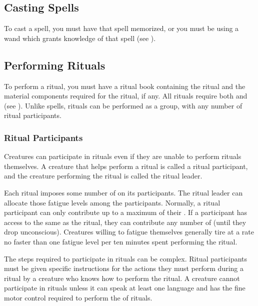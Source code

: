   \subsection{Casting Spells}
    To cast a spell, you must have that spell memorized, or you must be using a wand which grants knowledge of that spell (see ).

  \subsection{Performing Rituals}\label{Performing Rituals}
    To perform a ritual, you must have a ritual book containing the ritual and the material components required for the ritual, if any.
    All rituals require both  and  (see ).
    Unlike spells, rituals can be performed as a group, with any number of ritual participants.

    \subsubsection{Ritual Participants}
      Creatures can participate in rituals even if they are unable to perform rituals themselves.
      A creature that helps perform a ritual is called a ritual participant, and the creature performing the ritual is called the ritual leader.

      Each ritual imposes some number of  on its participants.
      The ritual leader can allocate those fatigue levels among the participants.
      Normally, a ritual participant can only contribute  up to a maximum of their .
      If a participant has access to the same  as the ritual, they can contribute any number of  (until they drop unconscious).
      Creatures willing to fatigue themselves generally tire at a rate no faster than one fatigue level per ten minutes spent performing the ritual.

      The steps required to participate in rituals can be complex.
      Ritual participants must be given specific instructions for the actions they must perform during a ritual by a creature who knows how to perform the ritual.
      A creature cannot participate in rituals unless it can speak at least one language and has the fine motor control required to perform the  of rituals.

